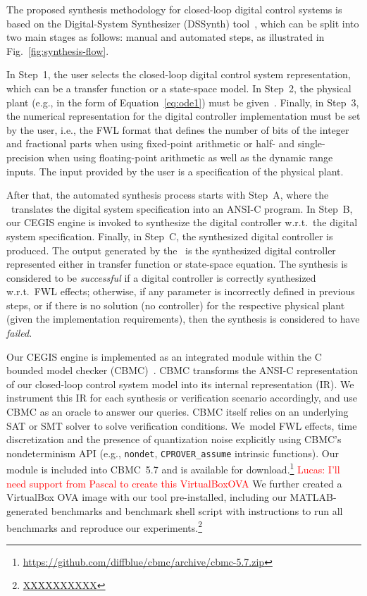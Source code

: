 \documentclass[twocolumn]{autart}    %
\begin{document}
The proposed synthesis methodology for closed-loop digital control
systems is based on the Digital-System Synthesizer 
(DSSynth) tool~\cite{DBLP:conf/kbse/AbateBCCCDKKP17}, 
which can be split into two main stages as follows: manual and 
automated steps, as illustrated in Fig.~\ref{fig:synthesis-flow}. 

In Step~1, the user selects the closed-loop digital control
system representation, which can be a transfer function or a state-space model.  
In Step~2, the physical plant (e.g., in the form of Equation~\eqref{eq:ode1}) must be
given~\cite{astrom1997computer}.  Finally, in Step~3, the numerical
representation for the digital controller implementation must be set by the
user, i.e., the FWL format that defines the number of bits of the integer
and fractional parts when using fixed-point arithmetic or half- and single-precision 
when using floating-point arithmetic as well as the dynamic range inputs.  The input 
provided by the user is a specification of the physical plant.

After that, the automated synthesis process starts with Step~A, where the
\tool~translates the digital system specification into an ANSI-C program.  
In Step~B, our CEGIS engine is invoked to
synthesize the digital controller w.r.t.~the digital system specification. 
Finally, in Step~C, the synthesized digital controller is produced.  The
output generated by the \tool~is the synthesized digital controller
represented either in transfer function or state-space equation.  The
synthesis is considered to be \emph{successful} if a digital controller is
correctly synthesized w.r.t.~FWL effects; otherwise, if any parameter is
incorrectly defined in previous steps, or if there is no solution (no
controller) for the respective physical plant (given the implementation
requirements), then the synthesis is considered to have \emph{failed}.

Our CEGIS engine is implemented as an integrated module within the C bounded
model checker (CBMC)~\cite{ClarkeKL04}.  CBMC transforms the ANSI-C representation
of our closed-loop control system model into its internal representation (IR).  We
instrument this IR for each synthesis or verification scenario accordingly,
and use CBMC as an oracle to answer our queries.  CBMC itself relies on an
underlying SAT or SMT solver to solve verification conditions.  We~model FWL
effects, time discretization and the presence of quantization noise
explicitly using CBMC's nondeterminism API (e.g., \texttt{nondet},
\texttt{CPROVER\_assume} intrinsic functions).  Our module is included into
CBMC~5.7 and is available for
download.\footnote{\url{https://github.com/diffblue/cbmc/archive/cbmc-5.7.zip}}
\textcolor{red}{Lucas: I'll need support from Pascal to create this VirtualBoxOVA}
We further created a VirtualBox OVA image with our tool pre-installed,
including our MATLAB-generated benchmarks and benchmark shell script with
instructions to run all benchmarks and reproduce our
experiments.\footnote{\url{XXXXXXXXXX}}
\end{document}
